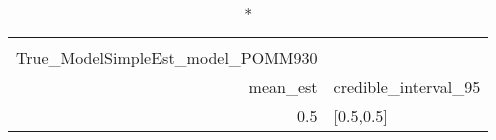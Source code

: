 \begin{longtable}{rl}
\caption*{
{\large alphasummarytable} \\ 
{\small True\_ModelSimpleEst\_model\_POMM930}
} \\ 
\toprule
mean\_est & credible\_interval\_95 \\ 
\midrule
0.5 & [0.5,0.5] \\ 
\bottomrule
\end{longtable}

